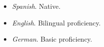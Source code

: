 \begin{itemize}
    \item \textit{Spanish}. Native.
    \item \textit{English}. Bilingual proficiency.
    \item \textit{German}. Basic proficiency.
\end{itemize}